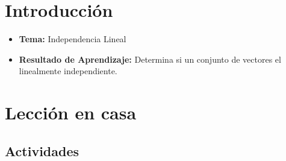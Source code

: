 \documentclass[a4,11pt]{aleph-notas}
\begin{document}
\encabezado


\section*{Introducción}

\begin{itemize}
    \item \textbf{Tema:} Independencia Lineal
    \item \textbf{Resultado de Aprendizaje:} Determina si un conjunto de vectores el linealmente independiente.
\end{itemize}

\section*{Lección en casa}

\subsection*{Actividades}
\end{document}
